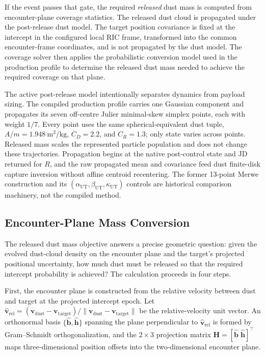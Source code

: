     If the event passes that gate, the required \emph{released} dust mass is computed from encounter-plane coverage statistics. The released dust cloud is propagated under the post-release dust model. The target position covariance is fixed at the intercept in the configured local RIC frame, transformed into the common encounter-frame coordinates, and is not propagated by the dust model. The coverage solver then applies the probabilistic conversion model used in the production profile to determine the released dust mass needed to achieve the required coverage on that plane.

    The active post-release model intentionally separates dynamics from payload sizing. The compiled production profile carries one Gaussian component and propagates its seven off-centre Julier minimal-skew simplex points, each with weight \(1/7\). Every point uses the same spherical-equivalent dust tuple, \(A/m=1.948~\si{\metre\squared\per\kilogram}\), \(C_D=2.2\), and \(C_R=1.3\); only state varies across points. Released mass scales the represented particle population and does not change these trajectories. Propagation begins at the native post-control state and JD returned for \(R\), and the raw propagated mean and covariance feed dust finite-disk capture inversion without affine centroid recentering. The former 13-point Merwe construction and its \((\alpha_{\mathrm{UT}},\beta_{\mathrm{UT}},\kappa_{\mathrm{UT}})\) controls are historical comparison machinery, not the compiled method.

    \subsection{Encounter-Plane Mass Conversion} \label{ss:encounter_plane_mass}
    The released dust mass objective answers a precise geometric question: given the evolved dust-cloud density on the encounter plane and the target's projected positional uncertainty, how much dust must be released so that the required intercept probability is achieved? The calculation proceeds in four steps.

    First, the encounter plane is constructed from the relative velocity between dust and target at the projected intercept epoch. Let \(\hat{\mathbf{v}}_{\mathrm{rel}} = (\mathbf{v}_{\mathrm{dust}} - \mathbf{v}_{\mathrm{target}})/\|\mathbf{v}_{\mathrm{dust}} - \mathbf{v}_{\mathrm{target}}\|\) be the relative-velocity unit vector. An orthonormal basis \(\{\hat{\mathbf{b}},\hat{\mathbf{h}}\}\) spanning the plane perpendicular to \(\hat{\mathbf{v}}_{\mathrm{rel}}\) is formed by Gram--Schmidt orthogonalization, and the \(2 \times 3\) projection matrix \(\mathbf{H} = [\hat{\mathbf{b}}\;\hat{\mathbf{h}}]^{\!\top}\) maps three-dimensional position offsets into the two-dimensional encounter plane.

